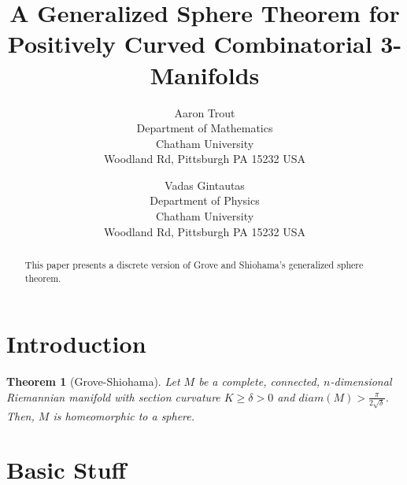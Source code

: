 \documentclass[12pt]{article}
\newtheorem{thm}{Theorem}[section]
\begin{document}
\nocite{*}

\title{A Generalized Sphere Theorem for Positively Curved Combinatorial 3-Manifolds}

\author{Aaron Trout \\ Department of Mathematics \\
Chatham University \\ Woodland Rd, Pittsburgh PA 15232 USA \and
Vadas Gintautas\\ Department of Physics \\
Chatham University \\ Woodland Rd, Pittsburgh PA 15232 USA}


\maketitle

\begin{abstract}
  This paper presents a discrete version of Grove and Shiohama's generalized sphere theorem.
\end{abstract}


\section{Introduction}

\begin{thm}[Grove-Shiohama] Let $M$ be a complete, connected, $n$-dimensional Riemannian manifold with section curvature $K \geq \delta > 0$ and $diam(M) > \frac{\pi}{2\sqrt{\delta}}$. Then, $M$ is homeomorphic to a sphere.
\end{thm}

\section{Basic Stuff}
\label{sect:basics}





\end{document}
